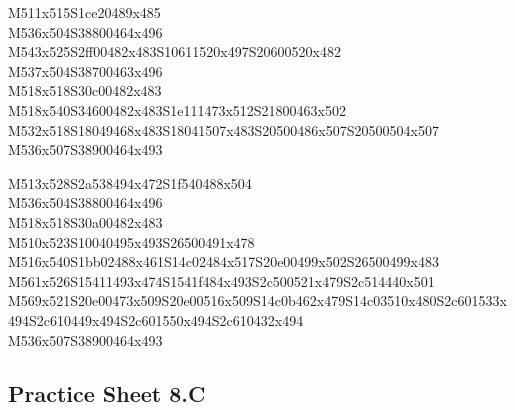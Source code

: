 \documentclass{article}
\begin{document}
\begin{multicols}{5}
\begin{center}
M511x515S1ce20489x485 %
\\M536x504S38800464x496 %
\\M543x525S2ff00482x483S10611520x497S20600520x482 %
\\M537x504S38700463x496 %
\\M518x518S30c00482x483 %
\\M518x540S34600482x483S1e111473x512S21800463x502 %
\\M532x518S18049468x483S18041507x483S20500486x507S20500504x507 %
\\M536x507S38900464x493 %
\vfil
\columnbreak

M513x528S2a538494x472S1f540488x504 %
\\M536x504S38800464x496 %
\\M518x518S30a00482x483 %
\\M510x523S10040495x493S26500491x478 %
\\M516x540S1bb02488x461S14c02484x517S20e00499x502S26500499x483 %
\\M561x526S15411493x474S1541f484x493S2c500521x479S2c514440x501 %
\\M569x521S20e00473x509S20e00516x509S14c0b462x479S14c03510x480S2c601533x494S2c610449x494S2c601550x494S2c610432x494 %
\\M536x507S38900464x493 %
\vfil

\end{center}
\end{multicols}

\subsection{Practice Sheet 8.C}
\end{document}
